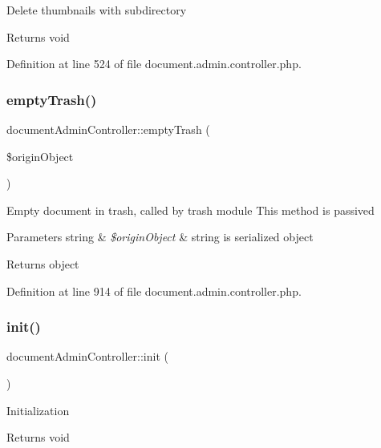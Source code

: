 Delete thumbnails with subdirectory \begin{DoxyReturn}{Returns}
void 
\end{DoxyReturn}


Definition at line 524 of file document.\+admin.\+controller.\+php.

\hypertarget{classdocumentAdminController_a52981a3af3d6b94661444f65568343ca}{}\label{classdocumentAdminController_a52981a3af3d6b94661444f65568343ca} 
\subsubsection{\texorpdfstring{empty\+Trash()}{emptyTrash()}}
{\footnotesize\ttfamily document\+Admin\+Controller\+::empty\+Trash (\begin{DoxyParamCaption}\item[{}]{\$origin\+Object }\end{DoxyParamCaption})}

Empty document in trash, called by trash module This method is passived 
\begin{DoxyParams}[1]{Parameters}
string & {\em \$origin\+Object} & string is serialized object \\
\hline
\end{DoxyParams}
\begin{DoxyReturn}{Returns}
object 
\end{DoxyReturn}


Definition at line 914 of file document.\+admin.\+controller.\+php.

\hypertarget{classdocumentAdminController_a14485f8ce213e059c30b41e6add269f9}{}\label{classdocumentAdminController_a14485f8ce213e059c30b41e6add269f9} 
\subsubsection{\texorpdfstring{init()}{init()}}
{\footnotesize\ttfamily document\+Admin\+Controller\+::init (\begin{DoxyParamCaption}{ }\end{DoxyParamCaption})}

Initialization \begin{DoxyReturn}{Returns}
void 
\end{DoxyReturn}


